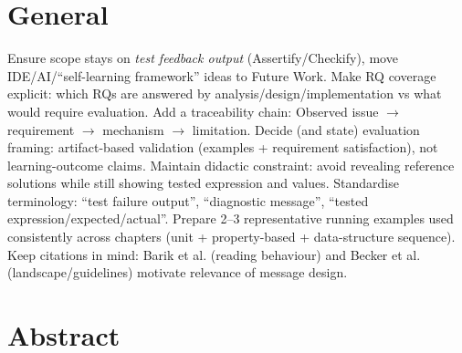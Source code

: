 \documentclass[
	bibliography=totoc,
	listof=totoc,
]{scrbook}
\begin{document}
\frontmatter %

\section*{General} %

\begin{marker}\begin{itemize}
    \todoItem Ensure scope stays on \emph{test feedback output} (Assertify/Checkify), move IDE/AI/``self-learning framework'' ideas to Future Work.
    \todoItem Make RQ coverage explicit: which RQs are answered by analysis/design/implementation vs what would require evaluation.
    \todoItem Add a traceability chain: Observed issue $\rightarrow$ requirement $\rightarrow$ mechanism $\rightarrow$ limitation.
    \todoItem Decide (and state) evaluation framing: artifact-based validation (examples + requirement satisfaction), not learning-outcome claims.
    \todoItem Maintain didactic constraint: avoid revealing reference solutions while still showing tested expression and values.
    \improveItem Standardise terminology: ``test failure output'', ``diagnostic message'', ``tested expression/expected/actual''.
    \finalizeItem Prepare 2--3 representative running examples used consistently across chapters (unit + property-based + data-structure sequence).
    \noteItem Keep citations in mind: Barik et al. (reading behaviour) and Becker et al. (landscape/guidelines) motivate relevance of message design.
\end{itemize}\end{marker}


\vfill\pagebreak %
\section*{Abstract} %
\end{document}
